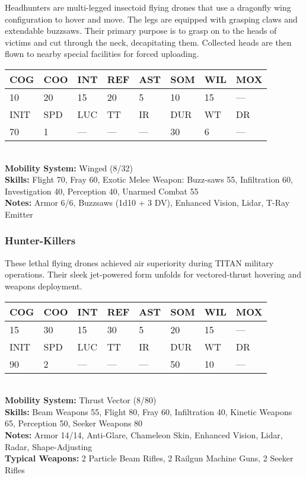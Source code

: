 Headhunters are multi-legged insectoid flying drones that use a dragonfly wing configuration to hover and move. The legs are equipped with grasping claws and extendable buzzsaws. Their primary purpose is to grasp on to the heads of victims and cut through the neck, decapitating them. Collected heads are then flown to nearby special facilities for forced uploading. \\ \begin{tabular}{|l|l|l|l|l|l|l|l|} \hline

COG &COO &INT &REF &AST &SOM &WIL &MOX \\ \hline

10 &20 &15 &20 &5 &10 &15 &— \\ \hline

INIT &SPD &LUC &TT &IR &DUR &WT &DR \\ \hline

70 &1 &— &— &— &30 &6 &— \\ \hline

\end{tabular} \\ \textbf{Mobility System: }Winged (8/32) \\ \textbf{Skills:} Flight 70, Fray 60, Exotic Melee Weapon: Buzz-saws 55, Infiltration 60, Investigation 40, Perception 40, Unarmed Combat 55 \\ \textbf{Notes:} Armor 6/6, Buzzsaws (1d10 + 3 DV), Enhanced Vision, Lidar, T-Ray Emitter 

\subsubsection{Hunter-Killers} 

These lethal flying drones achieved air superiority during TITAN military operations. Their sleek jet-powered form unfolds for vectored-thrust hovering and weapons deployment. \\ \begin{tabular}{|l|l|l|l|l|l|l|l|} \hline

COG &COO &INT &REF &AST &SOM &WIL &MOX \\ \hline

15 &30 &15 &30 &5 &20 &15 &— \\ \hline

INIT &SPD &LUC &TT &IR &DUR &WT &DR \\ \hline

90 &2 &— &— &— &50 &10 &— \\ \hline

\end{tabular} \\ \textbf{Mobility System: }Thrust Vector (8/80) \\ \textbf{Skills:} Beam Weapons 55, Flight 80, Fray 60, Infiltration 40, Kinetic Weapons 65, Perception 50, Seeker Weapons 80 \\ \textbf{Notes:} Armor 14/14, Anti-Glare, Chameleon Skin, Enhanced Vision, Lidar, Radar, Shape-Adjusting \\ \textbf{Typical Weapons:} 2 Particle Beam Rifles, 2 Railgun Machine Guns, 2 Seeker Rifles 

